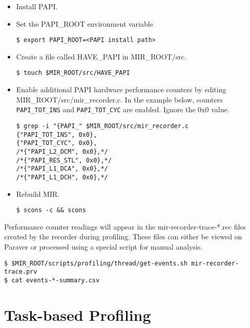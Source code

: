 \documentclass[11pt,a4paper]{article}
\begin{document}
\begin{itemize}
    \item Install PAPI.
    \item Set the \textsf{PAPI\_ROOT} environment variable

\begin{lstlisting}[style=MyInputStyle]
$ export PAPI_ROOT=<PAPI install path>
\end{lstlisting}

    \item Create a file called \textsf{HAVE\_PAPI} in \textsf{MIR\_ROOT/src}.

\begin{lstlisting}[style=MyInputStyle]
$ touch $MIR_ROOT/src/HAVE_PAPI
\end{lstlisting}

    \item Enable additional PAPI hardware performance counters by editing \textsf{MIR\_ROOT/src/mir\_recorder.c}. In the example below, counters \\ \texttt{PAPI\_TOT\_INS} and \texttt{PAPI\_TOT\_CYC} are enabled. Ignore the 0x0 value.

\begin{lstlisting}[style=MyInputStyle]
$ grep -i "{PAPI_" $MIR_ROOT/src/mir_recorder.c
{"PAPI_TOT_INS", 0x0},
{"PAPI_TOT_CYC", 0x0},
/*{"PAPI_L2_DCM", 0x0},*/
/*{"PAPI_RES_STL", 0x0},*/
/*{"PAPI_L1_DCA", 0x0},*/
/*{"PAPI_L1_DCH", 0x0},*/
\end{lstlisting}

    \item Rebuild MIR.

\begin{lstlisting}[style=MyInputStyle]
$ scons -c && scons
\end{lstlisting}
\end{itemize}

Performance counter readings will appear in the \textsf{mir-recorder-trace-*.rec} files created by the recorder during profiling. These files can either be viewed on Paraver or processed using a special script for manual analysis.

\begin{lstlisting}[style=MyInputStyle]
$ $MIR_ROOT/scripts/profiling/thread/get-events.sh mir-recorder-trace.prv
$ cat events-*-summary.csv
\end{lstlisting}

\section{Task-based Profiling}\label{sec:task-based-profiling}
\end{document}
